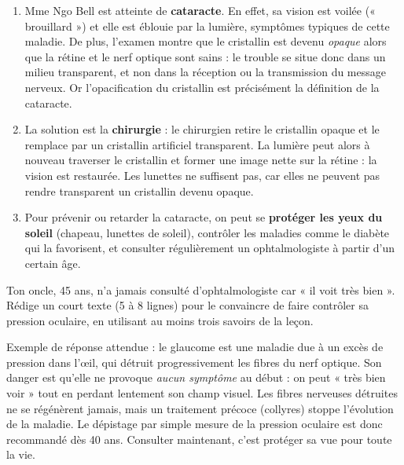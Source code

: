 \documentclass[11pt]{article}
\begin{document}
\begin{corrige}
\begin{enumerate}
\item Mme Ngo Bell est atteinte de \textbf{cataracte}. En effet, sa vision est voilée (« brouillard ») et elle est éblouie par la lumière, symptômes typiques de cette maladie. De plus, l'examen montre que le cristallin est devenu \emph{opaque} alors que la rétine et le nerf optique sont sains : le trouble se situe donc dans un milieu transparent, et non dans la réception ou la transmission du message nerveux. Or l'opacification du cristallin est précisément la définition de la cataracte.
\item La solution est la \textbf{chirurgie} : le chirurgien retire le cristallin opaque et le remplace par un cristallin artificiel transparent. La lumière peut alors à nouveau traverser le cristallin et former une image nette sur la rétine : la vision est restaurée. Les lunettes ne suffisent pas, car elles ne peuvent pas rendre transparent un cristallin devenu opaque.
\item Pour prévenir ou retarder la cataracte, on peut se \textbf{protéger les yeux du soleil} (chapeau, lunettes de soleil), contrôler les maladies comme le diabète qui la favorisent, et consulter régulièrement un ophtalmologiste à partir d'un certain âge.
\end{enumerate}
\end{corrige}

\begin{exercice}
Ton oncle, 45 ans, n'a jamais consulté d'ophtalmologiste car « il voit très bien ». Rédige un court texte (5 à 8 lignes) pour le convaincre de faire contrôler sa pression oculaire, en utilisant au moins trois savoirs de la leçon.
\end{exercice}

\begin{corrige}
Exemple de réponse attendue : le glaucome est une maladie due à un excès de pression dans l'œil, qui détruit progressivement les fibres du nerf optique. Son danger est qu'elle ne provoque \emph{aucun symptôme} au début : on peut « très bien voir » tout en perdant lentement son champ visuel. Les fibres nerveuses détruites ne se régénèrent jamais, mais un traitement précoce (collyres) stoppe l'évolution de la maladie. Le dépistage par simple mesure de la pression oculaire est donc recommandé dès 40 ans. Consulter maintenant, c'est protéger sa vue pour toute la vie.
\end{corrige}
\end{document}
